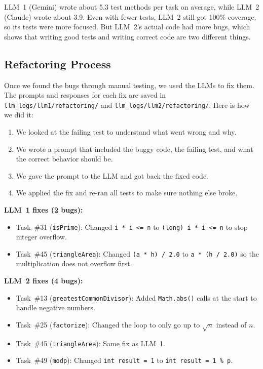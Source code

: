 \documentclass[12pt, a4paper]{article}
\begin{document}
LLM~1 (Gemini) wrote about 5.3 test methods per task on average, while LLM~2 (Claude) wrote about 3.9. Even with fewer tests, LLM~2 still got 100\% coverage, so its tests were more focused. But LLM~2's actual code had more bugs, which shows that writing good tests and writing correct code are two different things.

\subsection{Refactoring Process}

Once we found the bugs through manual testing, we used the LLMs to fix them. The prompts and responses for each fix are saved in \texttt{llm\_logs/llm1/refactoring/} and \texttt{llm\_logs/llm2/refactoring/}. Here is how we did it:

\begin{enumerate}
    \item We looked at the failing test to understand what went wrong and why.
    \item We wrote a prompt that included the buggy code, the failing test, and what the correct behavior should be.
    \item We gave the prompt to the LLM and got back the fixed code.
    \item We applied the fix and re-ran all tests to make sure nothing else broke.
\end{enumerate}

\textbf{LLM~1 fixes (2 bugs):}
\begin{itemize}
    \item Task~\#31 (\texttt{isPrime}): Changed \texttt{i * i <= n} to \texttt{(long) i * i <= n} to stop integer overflow.
    \item Task~\#45 (\texttt{triangleArea}): Changed \texttt{(a * h) / 2.0} to \texttt{a * (h / 2.0)} so the multiplication does not overflow first.
\end{itemize}

\textbf{LLM~2 fixes (4 bugs):}
\begin{itemize}
    \item Task~\#13 (\texttt{greatestCommonDivisor}): Added \texttt{Math.abs()} calls at the start to handle negative numbers.
    \item Task~\#25 (\texttt{factorize}): Changed the loop to only go up to $\sqrt{n}$ instead of $n$.
    \item Task~\#45 (\texttt{triangleArea}): Same fix as LLM~1.
    \item Task~\#49 (\texttt{modp}): Changed \texttt{int result = 1} to \texttt{int result = 1 \% p}.
\end{itemize}
\end{document}

